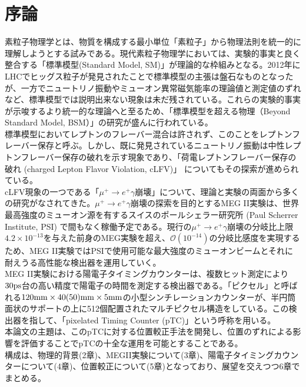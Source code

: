 \documentclass[Yonemoto_master.tex]{subfiles}
\begin{document}
\chapter{序論}

素粒子物理学とは、物質を構成する最小単位「素粒子」から物理法則を統一的に理解しようとする試みである。現代素粒子物理学においては、実験的事実と良く整合する「標準模型(Standard Model, SM)」が理論的な枠組みとなる。2012年にLHCでヒッグス粒子が発見されたことで標準模型の主張は盤石なものとなったが、一方でニュートリノ振動やミューオン異常磁気能率の理論値と測定値のずれなど、標準模型では説明出来ない現象は未だ残されている。これらの実験的事実が示唆するより統一的な理論へと至るため、「標準模型を超える物理（Beyond Standard Model, BSM）」の研究が盛んに行われている。\\

標準模型においてレプトンのフレーバー混合は許されず、このことをレプトンフレーバー保存と呼ぶ。しかし、既に発見されているニュートリノ振動は中性レプトンフレーバー保存の破れを示す現象であり、「荷電レプトンフレーバー保存の破れ (charged Lepton Flavor Violation, cLFV)」 についてもその探索が進められている。\\


cLFV現象の一つである「$\mu^+ \to e^+\gamma$崩壊」について、理論と実験の両面から多くの研究がなされてきた。$\mu^+ \to e^+\gamma$崩壊の探索を目的とするMEG II実験\cite{MEGII}は、世界最高強度のミューオン源を有するスイスのポールシェラー研究所 (Paul Scherrer Institute, PSI) で間もなく稼働予定である。現行の$\mu^+ \to e^+\gamma$崩壊の分岐比上限$4.2 \times 10^{-13}$を与えた前身のMEG実験\cite{MEG}を超え、$\mathcal{O}(10^{-14})$の分岐比感度を実現するため、MEG II実験ではPSIで使用可能な最大強度のミューオンビームとそれに耐えうる高性能な検出器を運用していく。\\


MEG II実験における陽電子タイミングカウンターは、複数ヒット測定により$ 30 \rm ps$台の高い精度で陽電子の時間を測定する検出器である。「ピクセル」と呼ばれる$120 {\rm mm} \times 40 (50){\rm mm} \times 5 {\rm mm}$の小型シンチレーションカウンターが、半円筒面状のサポートの上に512個配置されたマルチピクセル構造をしている。この検出器を指して、「pixelated Timing Counter (pTC)」という呼称を用いる。\\

本論文の主題は、このpTCに対する位置較正手法を開発し、位置のずれによる影響を評価することでpTCの十全な運用を可能とすることである。\\

構成は、物理的背景(2章)、MEGII実験について(3章)、陽電子タイミングカウンターについて(4章)、位置較正について(5章)となっており、展望を交えつつ6章でまとめる。
\end{document}
